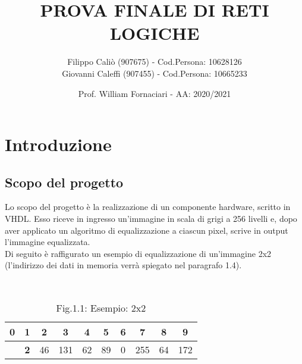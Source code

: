 \documentclass[12pt, table, xcdraw]{article}
\title{PROVA FINALE DI RETI LOGICHE}
\date{Prof. William Fornaciari - AA: 2020/2021}
\author{Filippo Caliò (907675) - Cod.Persona: 10628126 \\ Giovanni Caleffi (907455) - Cod.Persona: 10665233}
\begin{document}
\maketitle
{}
\tableofcontents

\newpage
{}

\section{Introduzione}

\subsection{Scopo del progetto}
Lo scopo del progetto è la realizzazione di un componente hardware, scritto in VHDL. Esso riceve in ingresso un'immagine in scala di grigi a 256 livelli e, dopo aver applicato un algoritmo di equalizzazione a ciascun pixel, scrive in output l'immagine equalizzata.\\
Di seguito è raffigurato un esempio di equalizzazione di un'immagine 2x2 (l'indirizzo dei dati in memoria verrà spiegato nel paragrafo 1.4).

\begin{table}[h!]
  \begin{center}
    \
	\begin{tabular}{cccccccccc}
	0                                                        & 1                                                       & 2                                               & 3                                                & 4                                               & 5                                               & 6                                              & 7                                                & 8                                               & 9                                                \\ \hline
	\rowcolor[HTML]{EFEFEF} 
	\multicolumn{1}{|c|}{\cellcolor[HTML]{EFEFEF}\textbf{2}} & \multicolumn{1}{c|}{\cellcolor[HTML]{EFEFEF}\textbf{2}} & \multicolumn{1}{c|}{\cellcolor[HTML]{EFEFEF}46} & \multicolumn{1}{c|}{\cellcolor[HTML]{EFEFEF}131} & \multicolumn{1}{c|}{\cellcolor[HTML]{EFEFEF}62} & \multicolumn{1}{c|}{\cellcolor[HTML]{EFEFEF}89} & \multicolumn{1}{c|}{\cellcolor[HTML]{EFEFEF}0} & \multicolumn{1}{c|}{\cellcolor[HTML]{EFEFEF}255} & \multicolumn{1}{c|}{\cellcolor[HTML]{EFEFEF}64} & \multicolumn{1}{c|}{\cellcolor[HTML]{EFEFEF}172} \\ \hline
	\end{tabular}
\caption*{Fig.1.1: Esempio: 2x2}
  \end{center}
\end{table}
\end{document}
